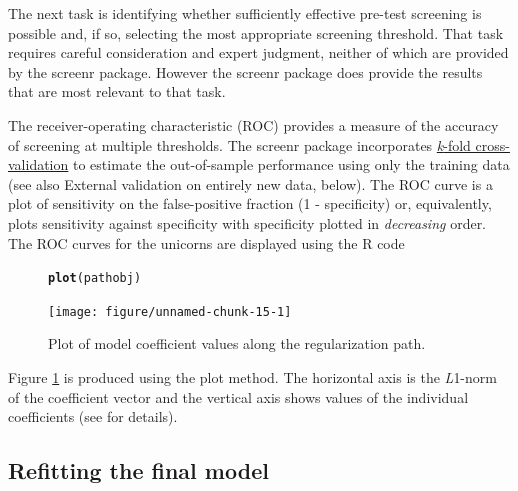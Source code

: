 \documentclass[11pt]{report}\usepackage[]{graphicx}\usepackage[]{xcolor}
\makeatletter
\newcommand{\hlstd}[1]{\textcolor[rgb]{0.345,0.345,0.345}{#1}}%
\newcommand{\hlkwd}[1]{\textcolor[rgb]{0.737,0.353,0.396}{\textbf{#1}}}%
\newenvironment{kframe}{%
 \def\at@end@of@kframe{}%
 \ifinner\ifhmode%
  \def\at@end@of@kframe{\end{minipage}}%
  \begin{minipage}{\columnwidth}%
 \fi\fi%
 \def\FrameCommand##1{\hskip\@totalleftmargin \hskip-\fboxsep
 \colorbox{shadecolor}{##1}\hskip-\fboxsep
     \hskip-\linewidth \hskip-\@totalleftmargin \hskip\columnwidth}%
 \MakeFramed {\advance\hsize-\width
   \@totalleftmargin\z@ \linewidth\hsize
   \@setminipage}}%
 {\par\unskip\endMakeFramed%
 \at@end@of@kframe}
\newenvironment{knitrout}{}{} %
\makeatother
\begin{document}
The next task is identifying whether sufficiently effective pre-test
screening is possible and, if so, selecting the most appropriate
screening threshold. That task requires careful consideration and
expert judgment, neither of which are provided by the \textsf{screenr}
package. However the \textsf{screenr} package does provide the results that are
most relevant to that task.

The receiver-operating characteristic (ROC) provides a measure of the
accuracy of screening at multiple thresholds. The \textsf{screenr} package
incorporates
\href{https://machinelearningmastery.com/k-fold-cross-validation/}{\emph{k}-fold
cross-validation}
to estimate the out-of-sample performance using only the training data
(see also \textsf{External validation on entirely new data}, below).
The ROC curve is a plot of
sensitivity on the false-positive fraction (1 - specificity) or,
equivalently, plots sensitivity against specificity with specificity plotted
in \emph{decreasing} order. The ROC curves for the unicorns are displayed
using the \textsf{R} code
\begin{figure}[!h]
  \begin{center}
\begin{knitrout}
\color{fgcolor}\begin{kframe}
\begin{alltt}
\hlkwd{plot}\hlstd{(pathobj)}
\end{alltt}
\end{kframe}
\texttt{[image: figure/unnamed-chunk-15-1]} 
\end{knitrout}
\caption{Plot of model coefficient values along the regularization
  path.}
\label{fig:f1}
\end{center}
\end{figure}
Figure \ref{fig:f1} is produced using the \textsf{plot} method. The horizontal
axis is the \emph{L}1-norm of the coefficient vector and the vertical
axis shows values of the individual coefficients (see
\citep{Park+Hastie2007} for details).


\subsection*{Refitting the final model}
\end{document}
